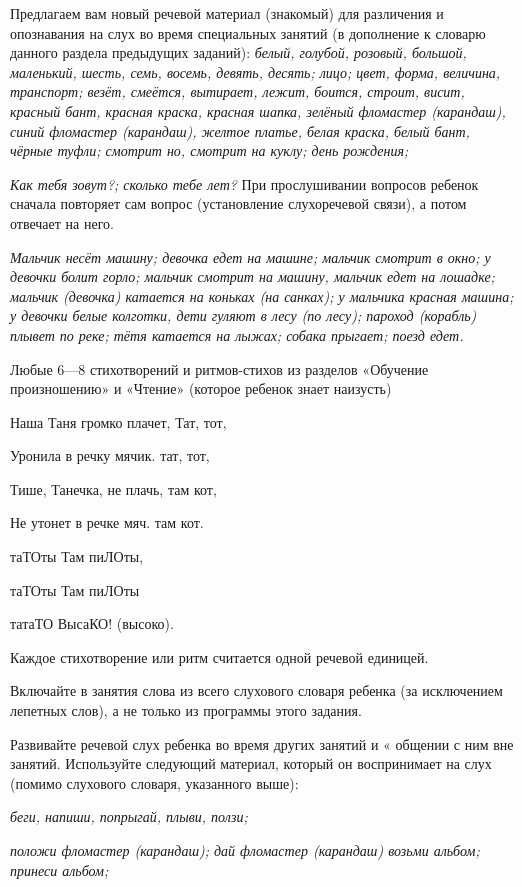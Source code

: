 \documentclass[a5paper]{book}
\renewcommand{\emph}[1]{\textit{#1}}
\begin{document}
Предлагаем вам новый речевой материал (знакомый) для различения и
опознавания на слух во время специальных занятий (в дополнение к словарю
данного раздела предыдущих заданий): \emph{белый, голубой, розовый,
большой, маленький, шесть, семь, восемь, девять, десять; лицо; цвет,
форма, величина, транспорт; везёт, смеётся, вытирает, лежит, боится,
строит, висит, красный бант, красная краска, красная шапка, зелёный
фломастер (карандаш), синий фломастер (карандаш), желтое платье, белая
краска, белый бант, чёрные туфли; смотрит но, смотрит на куклу; день
рождения;}

\emph{Как тебя зовут?; сколько тебе лет?} При прослушивании вопросов
ребенок сначала повторяет сам вопрос (установление слухоречевой связи),
а потом отвечает на него.

\emph{Мальчик несёт машину; девочка едет на машине; мальчик смотрит в
окно; у девочки болит горло; мальчик смотрит на машину, мальчик едет на
лошадке; мальчик (девочка) катается на коньках (на санках); у мальчика
красная машина; у девочки белые колготки, дети гуляют в лесу (по лесу);
пароход (корабль) плывет по реке; тётя катается на лыжах; собака
прыгает; поезд едет.}

Любые 6---8 стихотворений и ритмов-стихов из разделов «Обучение
произношению» и «Чтение» (которое ребенок знает наизусть)

Наша Таня громко плачет, Тат, тот,

Уронила в речку мячик. тат, тот,

Тише, Танечка, не плачь, там кот,

Не утонет в речке мяч. там кот.

таТОты Там пиЛОты,

таТОты Там пиЛОты

татаТО ВысаКО! (высоко).

Каждое стихотворение или ритм считается одной речевой единицей.

Включайте в занятия слова из всего слухового словаря ребенка (за
исключением лепетных слов), а не только из программы этого задания.

Развивайте речевой слух ребенка во время других занятий и « общении с
ним вне занятий. Используйте следующий материал, который он воспринимает
на слух (помимо слухового словаря, указанного выше):

\emph{беги, напиши, попрыгай, плыви, ползи;}

\emph{положи фломастер (карандаш); дай фломастер (карандаш) возьми
альбом; принеси альбом;}
\end{document}
